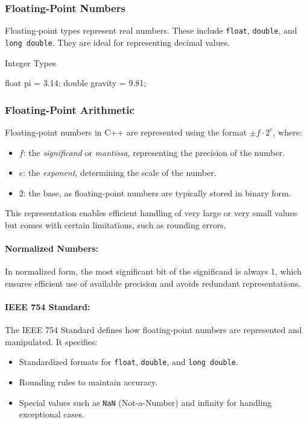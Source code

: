 \subsubsection{Floating-Point Numbers}

Floating-point types represent real numbers. These include \texttt{float}, \texttt{double}, and \texttt{long double}. They are ideal for representing decimal values.

\begin{exampleblock}{Integer Types}
    \begin{codeblock}[language=C++]
float pi = 3.14;
double gravity = 9.81;
    \end{codeblock}
\end{exampleblock}

\subsubsection{Floating-Point Arithmetic}

Floating-point numbers in C++ are represented using the format $\pm f \cdot 2^e$, where:
\begin{itemize}
    \item $f$: the \textit{significand} or \textit{mantissa}, representing the precision of the number.
    \item $e$: the \textit{exponent}, determining the scale of the number.
    \item $2$: the base, as floating-point numbers are typically stored in binary form.
\end{itemize}

This representation enables efficient handling of very large or very small values but comes with certain limitations, such as rounding errors.

\paragraph{Normalized Numbers:} 
In normalized form, the most significant bit of the significand is always 1, which ensures efficient use of available precision and avoids redundant representations.

\paragraph{IEEE 754 Standard:}
The IEEE 754 Standard defines how floating-point numbers are represented and manipulated. It specifies:
\begin{itemize}
    \item Standardized formats for \texttt{float}, \texttt{double}, and \texttt{long double}.
    \item Rounding rules to maintain accuracy.
    \item Special values such as \texttt{NaN} (Not-a-Number) and infinity for handling exceptional cases.
\end{itemize}


